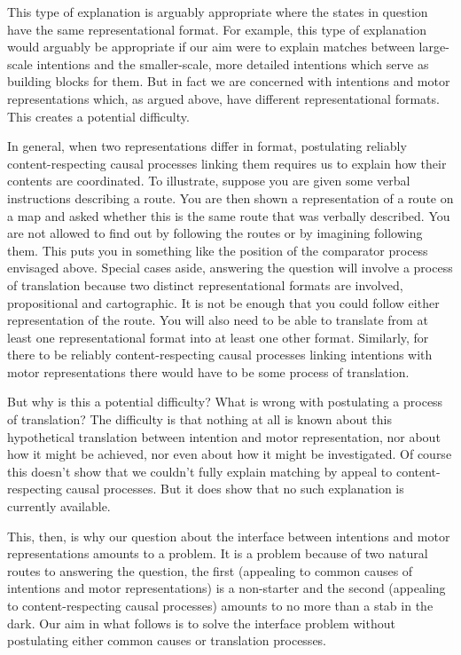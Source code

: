 \documentclass[12pt,\papersize]{extarticle}
\begin{document}
This type of explanation is arguably appropriate where the states in question have the same representational format.  For example, this type of explanation would arguably be appropriate if our aim were to explain matches between  large-scale intentions and the smaller-scale, more detailed intentions which serve as building blocks for them. But in fact we are concerned with intentions and motor representations which, as argued above, have different representational formats. This creates a potential difficulty.

In general, when two representations differ in format, postulating reliably content-respecting causal processes linking them requires us to explain how their contents are coordinated. To illustrate, suppose you are given some verbal instructions describing a route. You are then shown a representation of a route on a map and asked whether this is the same route that was verbally described. You are not allowed to find out by following the routes or by imagining following them. This puts you in something like the position of the comparator process envisaged above. Special cases aside, answering the question will involve a process of translation because two distinct representational formats are involved, propositional and cartographic. It is not be enough that you could follow either representation of the route. You will also need to be able to translate from at least one representational format into at least one other format. Similarly, for there to be reliably content-respecting causal processes linking intentions with motor representations there would have to be some process of translation.

But why is this a potential difficulty? What is wrong with postulating a process of translation? The difficulty is that nothing at all is known about this hypothetical translation between intention and motor representation, nor about how it might be achieved, nor even about how it might be investigated. Of course this doesn't show that we couldn't fully explain matching by appeal to content-respecting causal processes. But it does show that no such explanation is currently available.  

This, then, is why our question about the interface between intentions and motor representations amounts to a problem. It is a problem because of two natural routes to answering the question, the first (appealing to common causes of intentions and motor representations) is a non-starter and the second (appealing to content-respecting causal processes) amounts to no more than a stab in the dark.  Our aim in what follows is to solve the interface problem without postulating either common causes or translation processes.
\end{document}
